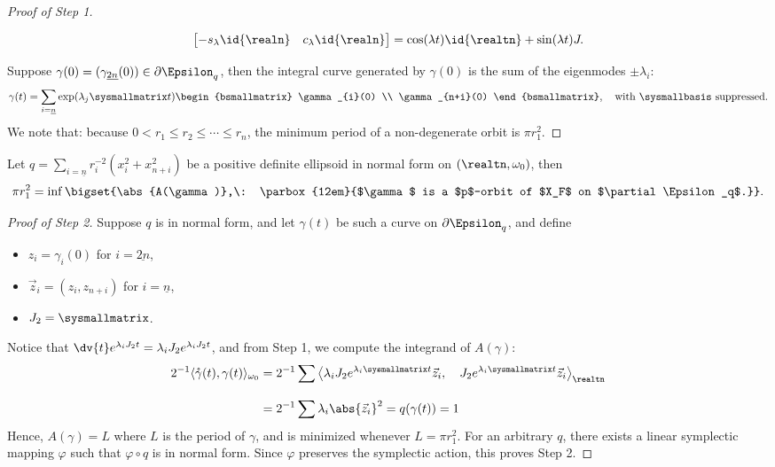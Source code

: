 \documentclass[../main-v2-manifolds.tex]{subfiles}
\begin{document}
\begin{proof}[Proof of Step 1]
\begin{note}
\begin{equation}
\begin{bmatrix}
            -s_\lambda \id{\realn} & c_{\lambda} \id{\realn}
        \end{bmatrix} = \cos(\lambda t)\id{\realtn} +\sin(\lambda t)J.
        \label{eq:matrix exponential j r2n lambda}
    \end{equation}
\end{note}
Suppose $\gamma(0) = (\gamma_{\underline{2n}}(0))\in\partial\Epsilon_q$, then the integral curve generated by $\gamma(0)$ is the sum of the eigenmodes $\pm\lambda_i$:
\[
    \gamma(t) = \sum_{i=\underline{n}}\exp(\lambda_j\sysmallmatrix t)\begin{bsmallmatrix}
        \gamma_{i}(0) \\ \gamma_{n+i}(0)
    \end{bsmallmatrix},\quad\text{with }\sysmallbasis \text{ suppressed.}
\]
We note that: because $0<r_1\leq r_2\leq\cdots\leq r_n$, the minimum period of a non-degenerate orbit is $\pi r_1^2$. 
\end{proof}
\begin{step}
    Let $q = \sum_{i=\underline{n}} r_i^{-2}(x^2_i + x^2_{n+i})$ be a positive definite ellipsoid in normal form on $(\realtn,\omega_0)$, then
    \[
        \pi r_1^2 = \inf\bigset{\abs{A(\gamma)},\: \parbox{12em}{$\gamma$ is a $p$-orbit of $X_F$ on $\partial \Epsilon_q$.}}.
    \]
\end{step}
\begin{proof}[Proof of Step 2]
    Suppose $q$ is in normal form, and let $\gamma(t)$ be such a curve on $\partial \Epsilon_q$, and define 
    \begin{multicols}{3}
    \begin{itemize}
        \item $z_i = \gamma_i(0)$ for $i = \underline{2n}$,
        \item $\vec{z}_i = (z_i, z_{n+i})$ for $i = \underline{n}$,
        \item $J_2 = \sysmallmatrix$.
    \end{itemize}    
    \end{multicols}
    Notice that $\dv{t}e^{\lambda_i J_2 t} = \lambda_i J_2e^{\lambda_i J_2 t}$, and from Step 1, we compute the integrand of $A(\gamma)$:
    \begin{align*}
        2^{-1}\langle \mathring{\gamma}(t),\gamma(t)\rangle_{\omega_0} &= 2^{-1}\sum \left\langle \lambda_i J_2 e^{\lambda_i \sysmallmatrix t} \vec{z}_i,\quad J_2e^{\lambda_i \sysmallmatrix t}\vec{z}_i\right\rangle_{\realtn}\\[2ex]
        &= 2^{-1}\sum \lambda_i\abs{\vec{z}_i}^2=q(\gamma(t))=1
    \end{align*}
    Hence, $A(\gamma) = L$ where $L$ is the period of $\gamma$, and is minimized whenever $L = \pi r_1^2$. For an arbitrary $q$, there exists a linear symplectic mapping $\varphi$ such that $\varphi\circ q$ is in normal form. Since $\varphi$ preserves the symplectic action, this proves Step 2.
\end{proof}
\end{document}
